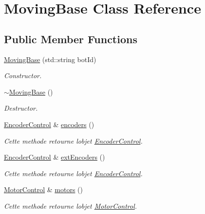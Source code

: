 \hypertarget{classMovingBase}{}\section{Moving\+Base Class Reference}
\label{classMovingBase}
\subsection*{Public Member Functions}
\begin{DoxyCompactItemize}
\item 
\mbox{\label{classMovingBase_a28c7a58f312d45b286d358756851866a}} 
\hyperlink{classMovingBase_a28c7a58f312d45b286d358756851866a}{Moving\+Base} (std\+::string bot\+Id)
\begin{DoxyCompactList}\small\item\em Constructor. \end{DoxyCompactList}\item 
\mbox{\label{classMovingBase_adda2ba94eaeea6a5f1fc857a211c5c06}} 
\hyperlink{classMovingBase_adda2ba94eaeea6a5f1fc857a211c5c06}{$\sim$\+Moving\+Base} ()
\begin{DoxyCompactList}\small\item\em Destructor. \end{DoxyCompactList}\item 
\hyperlink{classEncoderControl}{Encoder\+Control} \& \hyperlink{classMovingBase_ab5c7ea25f16c77159ead52e565a80eef}{encoders} ()
\begin{DoxyCompactList}\small\item\em Cette methode retourne l\textquotesingle{}objet \hyperlink{classEncoderControl}{Encoder\+Control}. \end{DoxyCompactList}\item 
\hyperlink{classEncoderControl}{Encoder\+Control} \& \hyperlink{classMovingBase_aede235e6b3c7379d472fad26b6f5655d}{ext\+Encoders} ()
\begin{DoxyCompactList}\small\item\em Cette methode retourne l\textquotesingle{}objet \hyperlink{classEncoderControl}{Encoder\+Control}. \end{DoxyCompactList}\item 
\hyperlink{classMotorControl}{Motor\+Control} \& \hyperlink{classMovingBase_a72c9d1576dd5305462f518d149d19c37}{motors} ()
\begin{DoxyCompactList}\small\item\em Cette methode retourne l\textquotesingle{}objet \hyperlink{classMotorControl}{Motor\+Control}. \end{DoxyCompactList}\item 

\end{DoxyCompactItemize}
